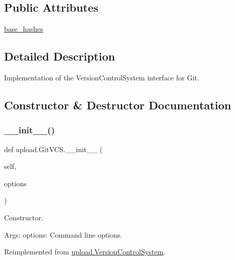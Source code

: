 \subsection*{Public Attributes}
\begin{DoxyCompactItemize}
\item 
\mbox{\hyperlink{classupload_1_1_git_v_c_s_a07e9469050a157f34fe804cdf6ecddac}{base\+\_\+hashes}}
\end{DoxyCompactItemize}


\subsection{Detailed Description}
\begin{DoxyVerb}Implementation of the VersionControlSystem interface for Git.\end{DoxyVerb}
 

\subsection{Constructor \& Destructor Documentation}
\mbox{\label{classupload_1_1_git_v_c_s_aba4e1dca1c4b3e5db7ba07f6bce3c839}} 
\subsubsection{\texorpdfstring{\_\_init\_\_()}{\_\_init\_\_()}\hspace{0.1cm}{\footnotesize\ttfamily [1/2]}}
{\footnotesize\ttfamily def upload.\+Git\+V\+C\+S.\+\_\+\+\_\+init\+\_\+\+\_\+ (\begin{DoxyParamCaption}\item[{}]{self,  }\item[{}]{options }\end{DoxyParamCaption})}

\begin{DoxyVerb}Constructor.

Args:
  options: Command line options.
\end{DoxyVerb}
 

Reimplemented from \mbox{\hyperlink{classupload_1_1_version_control_system_ace97e5785a2b40011404ae6fbb956ecf}{upload.\+Version\+Control\+System}}.

\mbox{\label{classupload_1_1_git_v_c_s_aba4e1dca1c4b3e5db7ba07f6bce3c839}} 
